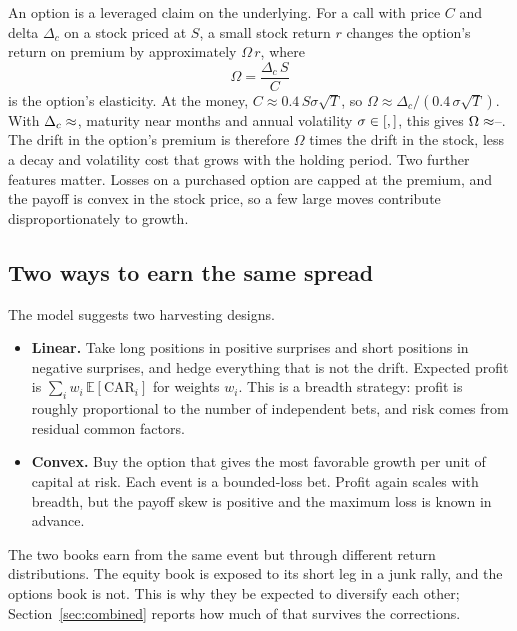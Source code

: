 \documentclass[11pt]{article}
\theoremstyle{definition}
\newcommand{\E}{\mathbb{E}}
\newcommand{\1}{\mathbf{1}}
\begin{document}
An option is a leveraged claim on the underlying. For a call with price $C$ and delta $\Delta_c$ on a
stock priced at $S$, a small stock return $r$ changes the option's return on premium by
approximately $\Omega\, r$, where
\begin{equation}
  \Omega=\frac{\Delta_c\,S}{C}
  \label{eq:omega}
\end{equation}
is the option's elasticity. At the money, $C\approx0.4\,S\sigma\sqrt{T}$, so
$\Omega\approx\Delta_c/(0.4\,\sigma\sqrt T)$. With $\Delta_c\approx\stv{model.delta}$, maturity near
 months and annual volatility $\sigma\in[\stv{model.sig_lo},\stv{model.sig_hi}]$,
this gives $\Omega\approx\stv{omega_lo}$--. The drift in the option's premium is
therefore $\Omega$ times the drift in the stock, less a decay and volatility cost that grows with the
holding period. Two further features matter. Losses on a purchased option are capped at the premium,
and the payoff is convex in the stock price, so a few large moves contribute disproportionately to
growth.

\subsection{Two ways to earn the same spread}

The model suggests two harvesting designs.
\begin{itemize}
  \item \textbf{Linear.} Take long positions in positive surprises and short positions in negative
        surprises, and hedge everything that is not the drift. Expected profit is
        $\sum_i w_i\,\E[\mathrm{CAR}_i]$ for weights $w_i$. This is a breadth strategy: profit is
        roughly proportional to the number of independent bets, and risk comes from residual
        common factors.
  \item \textbf{Convex.} Buy the option that gives the most favorable growth per unit of capital at
        risk. Each event is a bounded-loss bet. Profit again scales with breadth, but the payoff
        skew is positive and the maximum loss is known in advance.
\end{itemize}
The two books earn from the same event but through different return distributions. The equity book
is exposed to its short leg in a junk rally, and the options book is not. This is why they
be expected to diversify each other; Section~\ref{sec:combined} reports how much of that survives the corrections.

\end{document}
